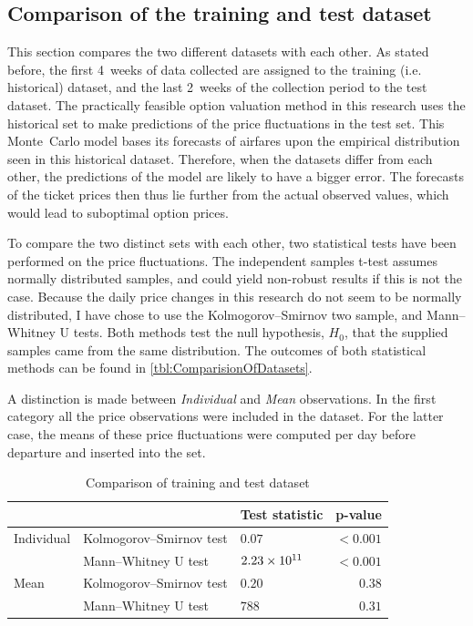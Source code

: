 \subsection{Comparison of the training and test dataset}
This section compares the two different datasets with each other. As stated before, the first 4~weeks of data collected are assigned to the training (i.e. historical) dataset, and the last 2~weeks of the collection period to the test dataset. The practically feasible option valuation method in this research uses the historical set to make predictions of the price fluctuations in the test set. This Monte~Carlo model bases its forecasts of airfares upon the empirical distribution seen in this historical dataset. Therefore, when the datasets differ from each other, the predictions of the model are likely to have a bigger error. The forecasts of the ticket prices then thus lie further from the actual observed values, which would lead to suboptimal option prices.

To compare the two distinct sets with each other, two statistical tests have been performed on the price fluctuations. The independent samples t-test assumes normally distributed samples, and could yield non-robust results if this is not the case. Because the daily price changes in this research do not seem to be normally distributed, I have chose to use the Kolmogorov--Smirnov two sample, and Mann--Whitney U tests. Both methods test the null hypothesis, $H_0$, that the supplied samples came from the same distribution.  The outcomes of both statistical methods can be found in \autoref{tbl:ComparisionOfDatasets}.

A distinction is made between \emph{Individual} and \emph{Mean} observations. In the first category all the price observations were included in the dataset. For the latter case, the means of these price fluctuations were computed per day before departure and inserted into the set.


\begin{table}
\centering
\begin{tabular}{l l l r}
\toprule
~  &  ~  &  Test statistic  &  p-value  \\
\midrule
Individual  &   Kolmogorov--Smirnov test  & $0.07$  &  $< 0.001$  \\
~           &   Mann--Whitney U test  &  $2.23 \times 10^{11}$ &  $< 0.001$ \\
Mean        &   Kolmogorov--Smirnov test  & $0.20$  &  $0.38$  \\
~           &   Mann--Whitney U test  &  $788$  &  $0.31$ \\
\bottomrule
\end{tabular}
\caption{Comparison of training and test dataset}
\label{tbl:ComparisionOfDatasets}
\end{table}


